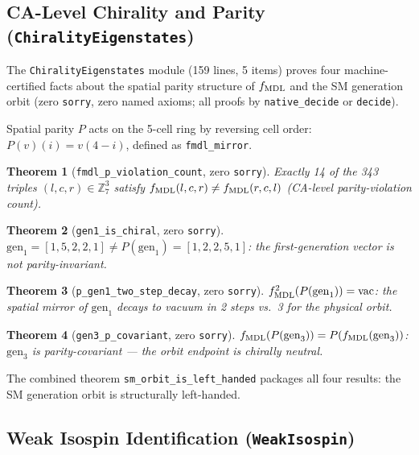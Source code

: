 \documentclass[11pt,a4paper]{article}
\newtheorem{theorem}{Theorem}[section]
\theoremstyle{definition}
\begin{document}
\subsection{CA-Level Chirality and Parity (\texttt{ChiralityEigenstates})}\label{subsec:chirality-eigenstates}

The \texttt{ChiralityEigenstates} module (159 lines, 5 items) proves four
machine-certified facts about the spatial parity structure of $f_{\rm MDL}$ and the SM
generation orbit (zero \texttt{sorry}, zero named axioms;
all proofs by \lstinline|native_decide| or \lstinline|decide|).

Spatial parity $P$ acts on the 5-cell ring by reversing cell order:
$P(v)(i) = v(4 - i)$, defined as \lstinline|fmdl_mirror|.

\begin{theorem}[\lstinline|fmdl_p_violation_count|, zero \texttt{sorry}]
Exactly 14 of the 343 triples $(l,c,r)\in\mathbb{Z}_7^3$ satisfy
$f_{\rm MDL}(l,c,r) \neq f_{\rm MDL}(r,c,l)$ (CA-level parity-violation count).
\end{theorem}

\begin{theorem}[\lstinline|gen1_is_chiral|, zero \texttt{sorry}]
$\mathrm{gen}_1 = [1,5,2,2,1] \neq P(\mathrm{gen}_1) = [1,2,2,5,1]$:
the first-generation vector is not parity-invariant.
\end{theorem}

\begin{theorem}[\lstinline|p_gen1_two_step_decay|, zero \texttt{sorry}]
$f_{\rm MDL}^2(P(\mathrm{gen}_1)) = \mathrm{vac}$: the spatial mirror of
$\mathrm{gen}_1$ decays to vacuum in 2 steps vs.\ 3 for the physical orbit.
\end{theorem}

\begin{theorem}[\lstinline|gen3_p_covariant|, zero \texttt{sorry}]
$f_{\rm MDL}(P(\mathrm{gen}_3)) = P(f_{\rm MDL}(\mathrm{gen}_3))$:
$\mathrm{gen}_3$ is parity-covariant --- the orbit endpoint is chirally neutral.
\end{theorem}

The combined theorem \lstinline|sm_orbit_is_left_handed| packages all four results:
the SM generation orbit is structurally left-handed.

\subsection{Weak Isospin Identification (\texttt{WeakIsospin})}\label{subsec:weak-isospin}
\end{document}
